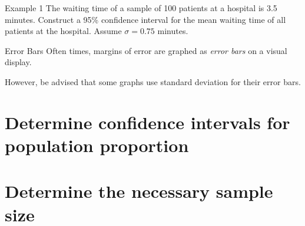 \documentclass[t]{beamer}
\begin{document}
\begin{frame}{Example 1}
The waiting time of a sample of 100 patients at a hospital is 3.5 minutes. Construct a 95\% confidence interval for the mean waiting time of all patients at the hospital. Assume $\sigma = 0.75$ minutes.	\newline\\	\pause
\end{frame}

\begin{frame}{Error Bars}
Often times, margins of error are graphed as \textit{error bars} on a visual display. \newline\\	\pause
\begin{center}
\end{center}
However, be advised that some graphs use standard deviation for their error bars.
\end{frame}
\section{Determine confidence intervals for population proportion}

\section{Determine the necessary sample size}
\end{document}
